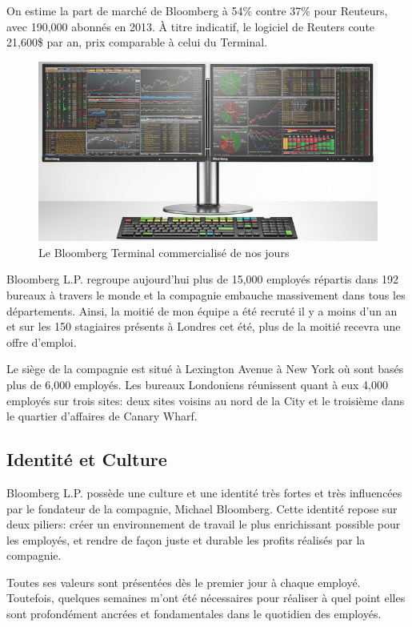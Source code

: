 \documentclass[11pt, oneside, titlepage, a4paper]{article}
\begin{document}
On estime la part de marché de Bloomberg à 54\% contre 37\% pour Reuteurs, avec 190,000 abonnés en 2013. À titre indicatif, le logiciel de Reuters coute 21,600\$ par an, prix comparable à celui du Terminal.
\\

\begin{figure}[h]
\begin{center}
\includegraphics[scale=0.3]{terminal.jpg}
\caption{Le Bloomberg Terminal commercialisé de nos jours}
\end{center}
\end{figure}
Bloomberg L.P. regroupe aujourd'hui plus de 15,000 employés répartis dans 192 bureaux à travers le monde et la compagnie embauche massivement dans tous les départements. Ainsi, la moitié de mon équipe a été recruté il y a moins d'un an et sur les 150 stagiaires présents à Londres cet été, plus de la moitié recevra une offre d'emploi.

Le siège de la compagnie est situé à Lexington Avenue à New York où sont basés plus de 6,000 employés. Les bureaux Londoniens réunissent quant à eux 4,000 employés sur trois sites: deux sites voisins au nord de la City et le troisième dans le quartier d'affaires de Canary Wharf.
	\subsection{Identité et Culture}
Bloomberg L.P. possède une culture et une identité très fortes et très influencées par le fondateur de la compagnie, Michael Bloomberg. Cette identité repose sur deux piliers: créer un environnement de travail le plus enrichissant possible pour les employés, et rendre de façon juste et durable les profits réalisés par la compagnie.

Toutes ses valeurs sont présentées dès le premier jour à chaque employé. Toutefois, quelques semaines m'ont été nécessaires pour réaliser à quel point elles sont profondément ancrées et fondamentales dans le quotidien des employés.
\end{document}

